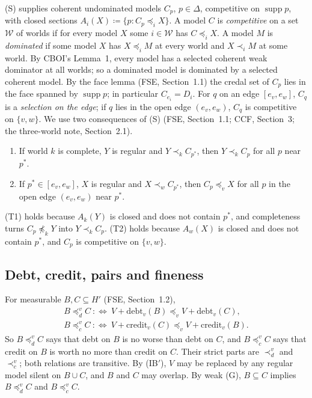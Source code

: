 \documentclass[11pt]{article}
\theoremstyle{definition}\newtheorem{definition}[theorem]{Definition}
\theoremstyle{remark}\newtheorem{remark}[theorem]{Remark}
\newcommand{\supp}{\operatorname{supp}}
\newcommand{\debt}{\mathrm{debt}}
\newcommand{\cred}{\mathrm{credit}}
\begin{document}
(S) supplies coherent undominated models $C_p$, $p\in\Delta$, competitive
on $\supp p$, with closed sections $A_i(X)\coloneqq\{p:C_p\preceq_iX\}$. A
model $C$ is \emph{competitive} on a set $\mathcal W$ of worlds if for
every model $X$ some $i\in\mathcal W$ has $C\preceq_iX$. A model $M$ is
\emph{dominated} if some model $X$ has $X\preceq_iM$ at every world and
$X\prec_iM$ at some world. By CBOI's Lemma~1, every model has a selected
coherent weak dominator at all worlds; so a dominated model is dominated
by a selected coherent model. By the face lemma (FSE, Section~1.1) the
credal set of $C_p$ lies in the face spanned by $\supp p$; in particular
$C_{e_i}=D_i$. For $q$ on an edge $[e_v,e_w]$, $C_q$ is a \emph{selection
on the edge}; if $q$ lies in the open edge $(e_v,e_w)$, $C_q$ is
competitive on $\{v,w\}$. We use two consequences of (S) (FSE,
Section~1.1; CCF, Section~3; the three-world note, Section~2.1).
\begin{enumerate}[label=(T\arabic*),leftmargin=*,itemsep=2pt]
\item If world $k$ is complete, $Y$ is regular and $Y\prec_kC_{p^*}$, then
$Y\prec_kC_p$ for all $p$ near $p^*$.
\item If $p^*\in[e_v,e_w]$, $X$ is regular and $X\prec_wC_{p^*}$, then
$C_p\preceq_vX$ for all $p$ in the open edge $(e_v,e_w)$ near $p^*$.
\end{enumerate}
(T1) holds because $A_k(Y)$ is closed and does not contain $p^*$, and
completeness turns $C_p\not\preceq_kY$ into $Y\prec_kC_p$. (T2) holds
because $A_w(X)$ is closed and does not contain $p^*$, and $C_p$ is
competitive on $\{v,w\}$.

\subsection{Debt, credit, pairs and fineness}\label{sec:pairs}

For measurable $B,C\subseteq H'$ (FSE, Section~1.2),
\begin{gather*}
 B\preceq^v_dC\ :\Longleftrightarrow\ V+\debt_v(B)\preceq_vV+\debt_v(C),\\
 B\preceq^v_cC\ :\Longleftrightarrow\ V+\cred_v(C)\preceq_vV+\cred_v(B).
\end{gather*}
So $B\preceq^v_dC$ says that debt on $B$ is no worse than debt on $C$, and
$B\preceq^v_cC$ says that credit on $B$ is worth no more than credit on
$C$. Their strict parts are $\prec^v_d$ and $\prec^v_c$; both relations
are transitive. By (IB$'$), $V$ may be replaced by any regular model silent
on $B\cup C$, and $B$ and $C$ may overlap. By weak (G), $B\subseteq C$
implies $B\preceq^v_dC$ and $B\preceq^v_cC$.
\end{document}
